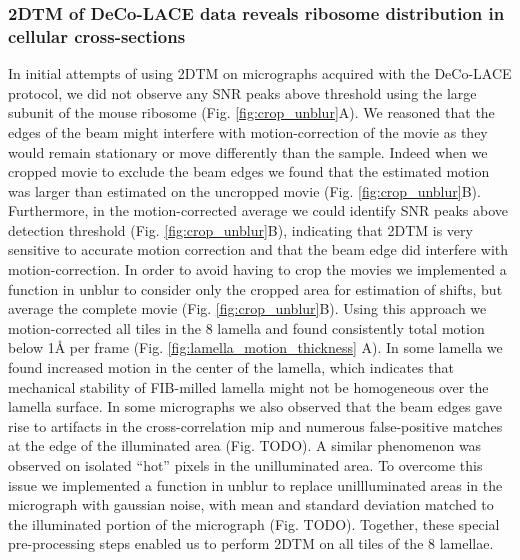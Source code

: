 \documentclass[
]{article}
\begin{document}
\hypertarget{dtm-of-deco-lace-data-reveals-ribosome-distribution-in-cellular-cross-sections}{%
\subsubsection{2DTM of DeCo-LACE data reveals ribosome distribution in cellular cross-sections}\label{dtm-of-deco-lace-data-reveals-ribosome-distribution-in-cellular-cross-sections}}

In initial attempts of using 2DTM on micrographs acquired with the DeCo-LACE
protocol, we did not observe any SNR peaks above threshold using the large
subunit of the mouse ribosome (Fig. \ref{fig:crop_unblur}A). We reasoned that the
edges of the beam might interfere with motion-correction of the movie as they
would remain stationary or move differently than the sample. Indeed when we
cropped movie to exclude the beam edges we found that the estimated motion was
larger than estimated on the uncropped movie (Fig. \ref{fig:crop_unblur}B).
Furthermore, in the motion-corrected average we could identify SNR peaks above
detection threshold (Fig. \ref{fig:crop_unblur}B), indicating that 2DTM is very
sensitive to accurate motion correction and that the beam edge did interfere
with motion-correction. In order to avoid having to crop the movies we
implemented a function in unblur to consider only the cropped area for
estimation of shifts, but average the complete movie (Fig. \ref{fig:crop_unblur}B).
Using this approach we motion-corrected all tiles in the 8 lamella and found
consistently total motion below 1Å per frame (Fig.
\ref{fig:lamella_motion_thickness} A). In some lamella we found increased motion in
the center of the lamella, which indicates that mechanical stability of
FIB-milled lamella might not be homogeneous over the lamella surface. In some
micrographs we also observed that the beam edges gave rise to artifacts in the
cross-correlation mip and numerous false-positive matches at the edge of the
illuminated area (Fig. TODO). A similar phenomenon was observed on isolated
``hot'' pixels in the unilluminated area. To overcome this issue we implemented a
function in unblur to replace unillluminated areas in the micrograph with
gaussian noise, with mean and standard deviation matched to the illuminated
portion of the micrograph (Fig. TODO). Together, these special pre-processing
steps enabled us to perform 2DTM on all tiles of the 8 lamellae.
\end{document}
